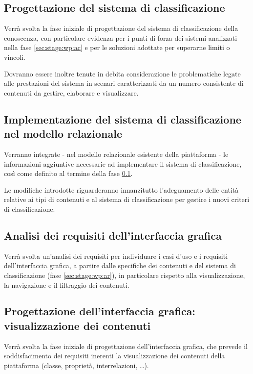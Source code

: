 \documentclass[10pt,a4paper,hidelinks]{scrartcl} %
\begin{document}
	\subsection{Progettazione del sistema di classificazione}
	\label{sec:stage:wp:design}
	Verrà svolta la fase iniziale di progettazione del sistema di classificazione della conoscenza, con particolare evidenza per i punti di forza dei sistemi analizzati nella fase \ref{sec:stage:wp:ac} e per le soluzioni adottate per superarne limiti o vincoli.

	Dovranno essere inoltre tenute in debita considerazione le problematiche legate alle prestazioni del sistema in scenari caratterizzati da un numero consistente di contenuti da gestire, elaborare e visualizzare.
	
	\subsection{Implementazione del sistema di classificazione nel modello relazionale}
	\label{sec:stage:wp:build}
	Verranno integrate - nel modello relazionale esistente della piattaforma - le informazioni aggiuntive necessarie ad implementare il sistema di classificazione, così come definito al termine della fase \ref{sec:stage:wp:design}.

	Le modifiche introdotte riguarderanno innanzitutto l'adeguamento delle entità relative ai tipi di contenuti e al sistema di classificazione per gestire i nuovi criteri di classificazione.

	\subsection{Analisi dei requisiti dell'interfaccia grafica}
	\label{sec:stage:wp:ui:ar}
	Verrà svolta un'analisi dei requisiti per individuare i casi d'uso e i requisiti dell'interfaccia grafica, a partire dalle specifiche dei contenuti e del sistema di classificazione (fase \ref{sec:stage:wp:ar}), in particolare rispetto alla visualizzazione, la navigazione e il filtraggio dei contenuti.

	\subsection{Progettazione dell'interfaccia grafica: visualizzazione dei contenuti}
	\label{sec:stage:wp:ui:design:view}
	Verrà svolta la fase iniziale di progettazione dell'interfaccia grafica, che prevede il soddisfacimento dei requisiti inerenti la visualizzazione dei contenuti della piattaforma (classe, proprietà, interrelazioni, \ldots).
	
\end{document}
